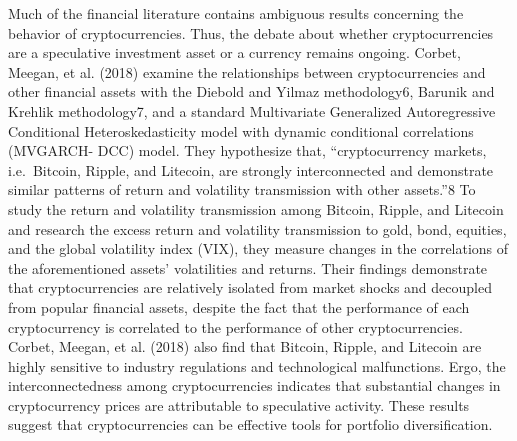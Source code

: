 \documentclass[]{article}
\begin{document}
Much of the financial literature contains ambiguous results concerning
the behavior of cryptocurrencies. Thus, the debate about whether
cryptocurrencies are a speculative investment asset or a currency
remains ongoing. Corbet, Meegan, et al. (2018) examine the relationships
between cryptocurrencies and other financial assets with the Diebold and
Yilmaz methodology6, Barunik and Krehlik methodology7, and a standard
Multivariate Generalized Autoregressive Conditional Heteroskedasticity
model with dynamic conditional correlations (MVGARCH- DCC) model. They
hypothesize that, ``cryptocurrency markets, i.e.~Bitcoin, Ripple, and
Litecoin, are strongly interconnected and demonstrate similar patterns
of return and volatility transmission with other assets.''8 To study the
return and volatility transmission among Bitcoin, Ripple, and Litecoin
and research the excess return and volatility transmission to gold,
bond, equities, and the global volatility index (VIX), they measure
changes in the correlations of the aforementioned assets' volatilities
and returns. Their findings demonstrate that cryptocurrencies are
relatively isolated from market shocks and decoupled from popular
financial assets, despite the fact that the performance of each
cryptocurrency is correlated to the performance of other
cryptocurrencies. Corbet, Meegan, et al. (2018) also find that Bitcoin,
Ripple, and Litecoin are highly sensitive to industry regulations and
technological malfunctions. Ergo, the interconnectedness among
cryptocurrencies indicates that substantial changes in cryptocurrency
prices are attributable to speculative activity. These results suggest
that cryptocurrencies can be effective tools for portfolio
diversification.
\end{document}
